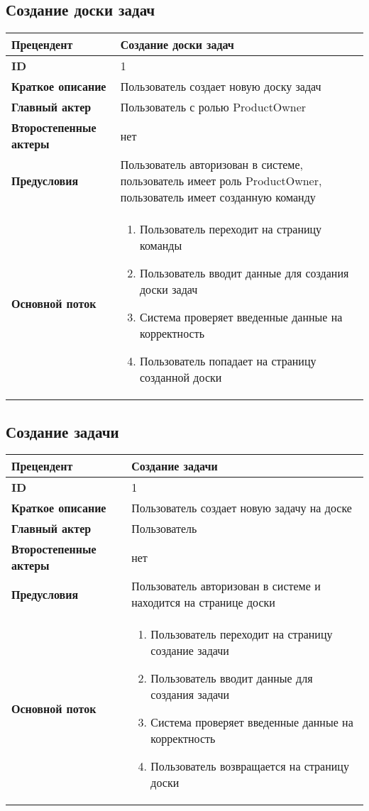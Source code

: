 \documentclass{article}
\begin{document}
\subsection{Создание доски задач}

\begin{tabular}{|l|p{9cm}|}
  \hline
  \textbf{Прецендент} & Создание доски задач  \\
  \hline
  \textbf{ID} & 1 \\
  \hline
  \textbf{Краткое описание} & Пользователь создает новую доску задач \\
  \hline
  \textbf{Главный актер} & Пользователь с ролью ProductOwner \\
  \hline
  \textbf{Второстепенные актеры} & нет \\
  \hline
  \textbf{Предусловия} &  Пользователь авторизован в системе, пользователь имеет роль ProductOwner, пользователь имеет созданную команду\\
  \hline
  \textbf{Основной поток} & \begin{enumerate}
    \item Пользователь переходит на страницу команды
    \item Пользователь вводит данные для создания доски задач
    \item Система проверяет введенные данные на корректность
    \item Пользователь попадает на страницу созданной доски
  \end{enumerate} \\
  \hline
\end{tabular}

\subsection{Создание задачи}

\begin{tabular}{|l|p{9cm}|}
  \hline
  \textbf{Прецендент} & Создание задачи \\
  \hline
  \textbf{ID} & 1 \\
  \hline
  \textbf{Краткое описание} & Пользователь создает новую задачу на доске \\
  \hline
  \textbf{Главный актер} & Пользователь\\
  \hline
  \textbf{Второстепенные актеры} & нет \\
  \hline
  \textbf{Предусловия} &  Пользователь авторизован в системе и находится на странице доски\\
  \hline
  \textbf{Основной поток} & \begin{enumerate}
    \item Пользователь переходит на страницу создание задачи
    \item Пользователь вводит данные для создания задачи
    \item Система проверяет введенные данные на корректность
    \item Пользователь возвращается на страницу доски
  \end{enumerate} \\
  \hline
\end{tabular} 
\end{document}
